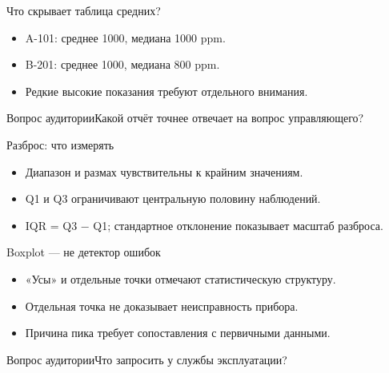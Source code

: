 \documentclass[aspectratio=169,10pt]{beamer}
\begin{document}
\begin{frame}[t]{Что скрывает таблица средних?}
\vspace{.15cm}\begin{itemize}
\item A-101: среднее 1000, медиана 1000 ppm.\vspace{6pt}
\item B-201: среднее 1000, медиана 800 ppm.\vspace{6pt}
\item Редкие высокие показания требуют отдельного внимания.\vspace{6pt}
\end{itemize}
\vfill\begin{alertblock}{Вопрос аудитории}\large Какой отчёт точнее отвечает на вопрос управляющего?\end{alertblock}
\end{frame}
\begin{frame}[t]{Разброс: что измерять}
\vspace{.15cm}\begin{itemize}
\item Диапазон и размах чувствительны к крайним значениям.\vspace{6pt}
\item Q1 и Q3 ограничивают центральную половину наблюдений.\vspace{6pt}
\item IQR = Q3 − Q1; стандартное отклонение показывает масштаб разброса.\vspace{6pt}
\end{itemize}
\end{frame}
\begin{frame}[t]{Boxplot — не детектор ошибок}
\vspace{.15cm}\begin{itemize}
\item «Усы» и отдельные точки отмечают статистическую структуру.\vspace{6pt}
\item Отдельная точка не доказывает неисправность прибора.\vspace{6pt}
\item Причина пика требует сопоставления с первичными данными.\vspace{6pt}
\end{itemize}
\vfill\begin{alertblock}{Вопрос аудитории}\large Что запросить у службы эксплуатации?\end{alertblock}
\end{frame}
\end{document}
